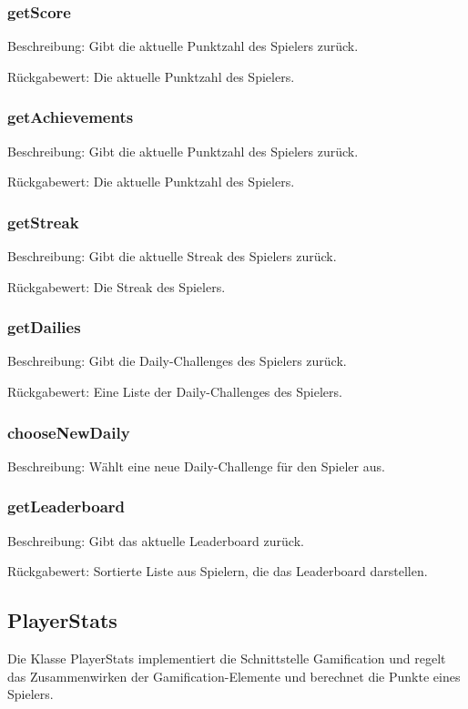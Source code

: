 \documentclass[a4paper]{scrreprt}
\begin{document}
   \subsubsection{getScore}
   \item Beschreibung: Gibt die aktuelle Punktzahl des Spielers zurück.
   \item Rückgabewert: Die aktuelle Punktzahl des Spielers.
   \subsubsection{getAchievements}
   \item Beschreibung: Gibt die aktuelle Punktzahl des Spielers zurück.
   \item Rückgabewert: Die aktuelle Punktzahl des Spielers.
   \subsubsection{getStreak}
   \item Beschreibung: Gibt die aktuelle Streak des Spielers zurück.
   \item Rückgabewert: Die Streak des Spielers.
   \subsubsection{getDailies}
   \item Beschreibung: Gibt die Daily-Challenges des Spielers zurück.
   \item Rückgabewert: Eine Liste der Daily-Challenges des Spielers.
   \subsubsection{chooseNewDaily}
   \item Beschreibung: Wählt eine neue Daily-Challenge für den Spieler aus.
   \subsubsection{getLeaderboard}
   \item Beschreibung: Gibt das aktuelle Leaderboard zurück.
   \item Rückgabewert: Sortierte Liste aus Spielern, die das Leaderboard darstellen.
  
   
   \subsection{PlayerStats}
   Die Klasse PlayerStats implementiert die Schnittstelle Gamification und regelt das Zusammenwirken der Gamification-Elemente und berechnet die Punkte eines Spielers.
\end{document}

